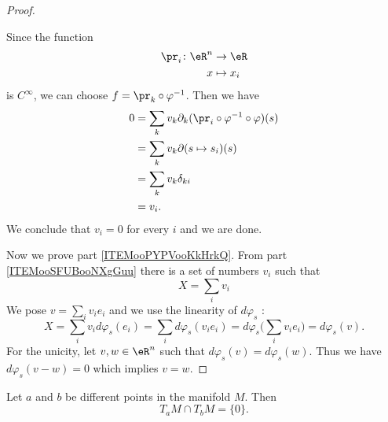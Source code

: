 \begin{proof}
\begin{subproof}
\begin{equation}
            \end{equation}
            Since the function
            \begin{equation}
                \begin{aligned}
                    \pr_i\colon \eR^n&\to \eR \\
                    x&\mapsto x_i 
                \end{aligned}
            \end{equation}
            is \(  C^{\infty}\), we can choose \( f=\pr_k\circ\varphi^{-1}\). Then we have
            \begin{subequations}
                \begin{align}
                    0&=\sum_kv_k\partial_k(\pr_i\circ\varphi^{-1}\circ\varphi)(s)\\
                    &=\sum_kv_k\partial(s\mapsto s_i)(s)\\
                    &=\sum_kv_k\delta_{ki}\\
                    &=v_i.
                \end{align}
            \end{subequations}
            We conclude that \( v_i=0\) for every \( i\) and we are done.
    \end{subproof}
    Now we prove part \ref{ITEMooPYPVooKkHrkQ}. From part \ref{ITEMooSFUBooNXgGuu} there is a set of numbers \( v_i\) such that
    \begin{equation}
        X=\sum_iv_i
    \end{equation}
    We pose \( v=\sum_iv_ie_i\) and we use the linearity of \( d\varphi_s\) :
    \begin{equation}
        X=\sum_iv_id\varphi_s(e_i)=\sum_id\varphi_s(v_ie_i)=d\varphi_s\big( \sum_iv_ie_i \big)=d\varphi_s(v).
    \end{equation}
    For the unicity, let \( v,w\in \eR^n\) such that \( d\varphi_s(v)=d\varphi_s(w)\). Thus we have \( d\varphi_s(v-w)=0\) which implies \( v=w\).
\end{proof}

\begin{lemma}
    Let \( a\) and \( b\) be different points in the manifold \( M\). Then
    \begin{equation}
        T_aM\cap T_bM=\{ 0 \}.
    \end{equation}
\end{lemma}

